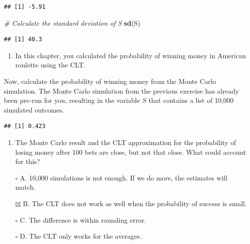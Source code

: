 \documentclass[
]{article}
\newenvironment{Shaded}{\begin{snugshade}}{\end{snugshade}}
\newcommand{\CommentTok}[1]{\textcolor[rgb]{0.56,0.35,0.01}{\textit{#1}}}
\newcommand{\DecValTok}[1]{\textcolor[rgb]{0.00,0.00,0.81}{#1}}
\newcommand{\KeywordTok}[1]{\textcolor[rgb]{0.13,0.29,0.53}{\textbf{#1}}}
\newcommand{\NormalTok}[1]{#1}
\newcommand{\OperatorTok}[1]{\textcolor[rgb]{0.81,0.36,0.00}{\textbf{#1}}}
\newcommand{\StringTok}[1]{\textcolor[rgb]{0.31,0.60,0.02}{#1}}
\providecommand{\tightlist}{%
  \setlength{\itemsep}{0pt}\setlength{\parskip}{0pt}}
\begin{document}
\begin{verbatim}
## [1] -5.91
\end{verbatim}

\begin{Shaded}
\begin{Highlighting}[]
\CommentTok{\# Calculate the standard deviation of \textquotesingle{}S\textquotesingle{}}
\KeywordTok{sd}\NormalTok{(S)}
\end{Highlighting}
\end{Shaded}

\begin{verbatim}
## [1] 40.3
\end{verbatim}

\begin{enumerate}
\def\labelenumi{\arabic{enumi}.}
\setcounter{enumi}{2}
\tightlist
\item
  In this chapter, you calculated the probability of winning money in
  American roulette using the CLT.
\end{enumerate}

Now, calculate the probability of winning money from the Monte Carlo
simulation. The Monte Carlo simulation from the previous exercise has
already been pre-run for you, resulting in the variable \(S\) that
contains a list of 10,000 simulated outcomes.

\begin{Shaded}
\end{Shaded}

\begin{verbatim}
## [1] 0.423
\end{verbatim}

\begin{enumerate}
\def\labelenumi{\arabic{enumi}.}
\setcounter{enumi}{3}
\tightlist
\item
  The Monte Carlo result and the CLT approximation for the probability
  of losing money after 100 bets are close, but not that close. What
  could account for this?
\end{enumerate}

\begin{itemize}
\tightlist
\item[$\square$]
  A. 10,000 simulations is not enough. If we do more, the estimates will
  match.
\item[$\boxtimes$]
  B. The CLT does not work as well when the probability of success is
  small.
\item[$\square$]
  C. The difference is within rounding error.
\item[$\square$]
  D. The CLT only works for the averages.
\end{itemize}
\end{document}
